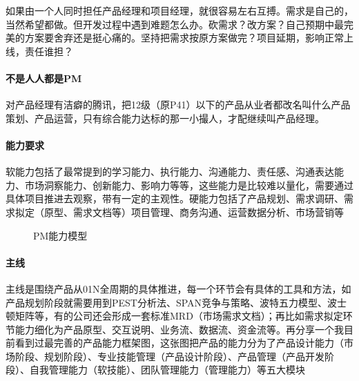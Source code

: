 \documentclass[letterpaper,11pt,english]{sphinxmanual}
\begin{document}
如果由一个人同时担任产品经理和项目经理，就很容易左右互搏。需求是自己的，当然希望都做。但开发过程中遇到难题怎么办。砍需求？改方案？自己预期中最完美的方案要舍弃还是挺心痛的。坚持把需求按原方案做完？项目延期，影响正常上线，责任谁担？


\paragraph{不是人人都是PM}
\label{\detokenize{chapter_introduction/PM:pm}}
对产品经理有洁癖的腾讯，把12级（原P4\sphinxhyphen{}1）以下的产品从业者都改名叫什么产品策划、产品运营，只有综合能力达标的那一小撮人，才配继续叫产品经理。%
\begin{footnote}[53]\sphinxAtStartFootnote
{}
%
\end{footnote}


\paragraph{能力要求}
\label{\detokenize{chapter_introduction/PM:id5}}
软能力包括了最常提到的学习能力、执行能力、沟通能力、责任感、沟通表达能力、市场洞察能力、创新能力、影响力等等，这些能力是比较难以量化，需要通过具体项目推进去观察，带有一定的主观性。硬能力包括了产品规划、需求调研、需求拟定（原型、需求文档等）项目管理、商务沟通、运营数据分析、市场营销等

\begin{figure}[H]
\centering
\capstart

\noindent{}
\caption{PM能力模型}\label{\detokenize{chapter_introduction/PM:id30}}\end{figure}


\paragraph{主线}
\label{\detokenize{chapter_introduction/PM:id6}}
主线是围绕产品从0\sphinxhyphen{}1\sphinxhyphen{}N全周期的具体推进，每一个环节会有具体的工具和方法，如产品规划阶段就需要用到PEST分析法、SPAN竞争与策略、波特五力模型、波士顿矩阵等，有的公司还会形成一套标准MRD（市场需求文档）；再比如需求拟定环节能力细化为产品原型、交互说明、业务流、数据流、资金流等。再分享一个我目前看到过最完善的产品能力框架图，这张图把产品的能力分为了产品设计能力（市场阶段、规划阶段）、专业技能管理（产品设计阶段）、产品管理（产品开发阶段）、自我管理能力（软技能）、团队管理能力（管理能力）等五大模块
\end{document}
